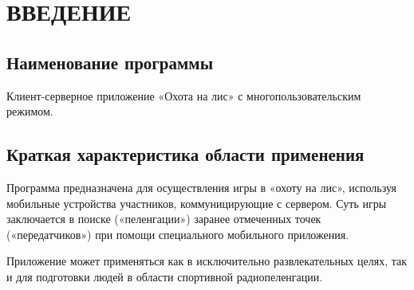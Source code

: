 \section{ВВЕДЕНИЕ}

\noindent\subsection{Наименование программы}

Клиент-серверное приложение «Охота на лис» с многопользовательским режимом.

\noindent\subsection{Краткая характеристика области применения}

Программа предназначена для осуществления игры в «охоту на лис», используя мобильные устройства участников, коммуницирующие с сервером. Суть игры заключается в поиске («пеленгации») заранее отмеченных точек («передатчиков») при помощи специального мобильного приложения.

Приложение может применяться как в исключительно развлекательных целях, так и для подготовки людей в области спортивной радиопеленгации.

\clearpage
